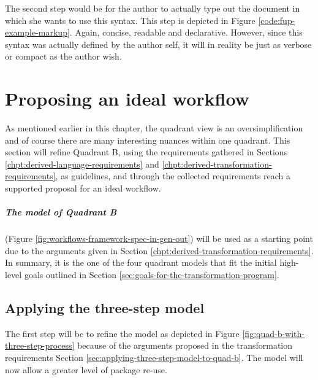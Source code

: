 \documentclass{scrreprt}
\begin{document}
The second step would be for the author to actually type out the document in which she wants to use this syntax. This step is depicted in Figure \ref{code:fup-example-markup}. Again, concise, readable and declarative. However, since this syntax was actually defined by the author self, it will in reality be just as verbose or compact as the author wish.














%
%
%
%
%
%




\chapter{Proposing an ideal workflow}
\label{chpt:proposal-transformation-workflow}
As mentioned earlier in this chapter, the quadrant view is an oversimplification and of course there are many interesting nuances within one quadrant. This section will refine Quadrant B, using the requirements gathered in Sections \ref{chpt:derived-language-requirements} and \ref{chpt:derived-transformation-requirements}, as guidelines, and through the collected requirements reach a supported proposal for an ideal workflow.

\paragraph{The model of Quadrant B} (Figure \ref{fig:workflows-framework-spec-in-gen-out}) will be used as a starting point due to the arguments given in Section \ref{chpt:derived-transformation-requirements}. In summary, it is the one of the four quadrant models that fit the initial high-level goals outlined in Section \ref{sec:goals-for-the-transformation-program}.



\section{Applying the three-step model}
The first step will be to refine the model as depicted in Figure \ref{fig:quad-b-with-three-step-process} because of the arguments proposed in the transformation requirements Section \ref{sec:applying-three-step-model-to-quad-b}. The model will now allow a greater level of package re-use.
\end{document}
